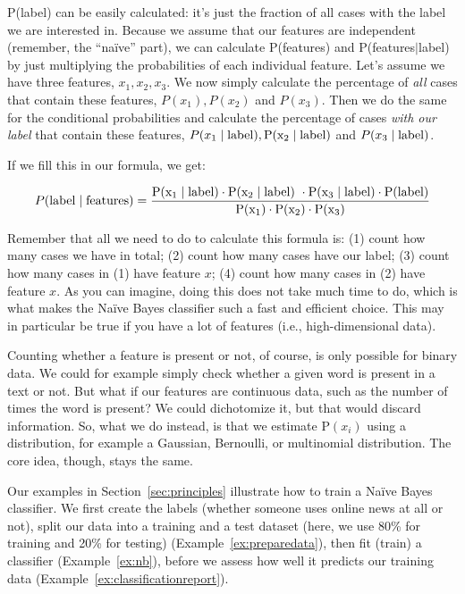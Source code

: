 P(label) can be easily calculated: it's just the fraction of all
cases with the label we are interested in.  Because we assume that our
features are independent (remember, the ``na\"ive'' part), we can
calculate P(features) and P(features$\mid$label) by just
multiplying the probabilities of each individual feature.  Let's
assume we have three features, $x_1, x_2, x_3$.  We now simply
calculate the percentage of \emph{all} cases that contain these
features, ${P}(x_1), {P}(x_2)$ and ${P}(x_3)$.  Then we do the same for the
conditional probabilities and calculate the percentage of cases
\emph{with our label} that contain these features, ${P}(x_1\mid \rm{label}),
{P}(x_2\mid \rm{label})$ and ${P}(x_3\mid \rm{label})$.

If we fill this in our formula, we get:


$$ P(\rm{label} \mid \rm{features}) = \frac{P(x_1 \mid label) \cdot P(x_2 \mid \rm{label})\ \cdot P(x_3 \mid label) \cdot P(label)}{P(x_1) \cdot P(x_2) \cdot P(x_3)}$$

Remember that all we need to do to calculate this formula is: (1)
count how many cases we have in total; (2) count how many cases
have our label; (3) count how many cases in (1) have feature $x$;
(4) count  how many cases in (2) have feature $x$.  As you can
imagine, doing this does not take much time to do, which is what makes the
Na\"ive Bayes classifier such a fast and efficient choice.  This may
in particular be true if you have a lot of features (i.e.,
high-dimensional data).

Counting whether a feature is present or not, of course, is only
possible for binary data. We could for example simply check whether a
given word is present in a text or not.  But what if our features are
continuous data, such as the number of times the word is present?  We
could dichotomize it, but that would discard information.  So, what
we do instead, is that we estimate P$(x_i)$ using a distribution, for
example a Gaussian, Bernoulli, or multinomial distribution. The core
idea, though, stays the same.

Our examples in Section~\ref{sec:principles} illustrate how to train a Na\"ive Bayes classifier.
We first create the labels (whether someone uses online news at all or
not), split our data into a training and a test dataset (here, we use
80\% for training and 20\% for testing) (Example~\ref{ex:preparedata}), then
fit (train) a classifier (Example~\ref{ex:nb}), before we assess how well it
predicts our training data (Example~\ref{ex:classificationreport}).

